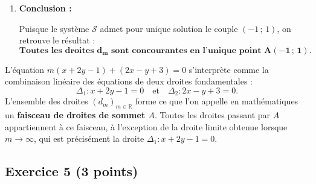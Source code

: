 \documentclass[11pt,a4paper]{article}
\newcommand{\R}{\mathbb{R}}
\begin{document}
\begin{correctionbox}
\begin{enumerate}
\begin{enumerate}
        Or, un polynôme à coefficients réels de degré au plus 1 est nul pour tout $m \in \R$ si et seulement si tous ses coefficients sont nuls :
        \[
        \forall m \in \R, \quad m(x + 2y - 1) + (2x - y + 3) = 0 \iff \begin{cases} x + 2y - 1 = 0 \\ 2x - y + 3 = 0 \end{cases}
        \]
        ce qui signifie précisément que $(x\,;\,y)$ est solution du système $\mathscr{S}$.
        
        L'équivalence est ainsi rigoureusement démontrée :
        \[
        \mathbf{(M(x\,;\,y) \in d_m \quad \forall m \in \R) \iff (x\,;\,y) \text{ est solution de } \mathscr{S}}.
        \]

        \item \textbf{Conclusion :}
        
        Puisque le système $\mathscr{S}$ admet pour unique solution le couple $(-1\,;\,1)$, on retrouve le résultat :
        \[
        \mathbf{\text{Toutes les droites } d_m \text{ sont concourantes en l'unique point } A(-1\,;\,1)}.
        \]
    \end{enumerate}
\end{enumerate}
\end{correctionbox}

\begin{remarquebox}
L'équation $m(x + 2y - 1) + (2x - y + 3) = 0$ s'interprète comme la combinaison linéaire des équations de deux droites fondamentales :
\[
\Delta_1 : x + 2y - 1 = 0 \quad \text{et} \quad \Delta_2 : 2x - y + 3 = 0.
\]
L'ensemble des droites $(d_m)_{m \in \R}$ forme ce que l'on appelle en mathématiques un \textbf{faisceau de droites de sommet $A$}.
Toutes les droites passant par $A$ appartiennent à ce faisceau, à l'exception de la droite limite obtenue lorsque $m \to \infty$, qui est précisément la droite $\Delta_1 : x + 2y - 1 = 0$.
\end{remarquebox}

\vspace{0.3cm}

\subsection*{Exercice 5 \hfill \normalfont\normalsize (3 points)}
\end{document}
